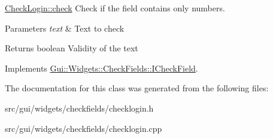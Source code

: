 \hyperlink{classGui_1_1Widgets_1_1CheckFields_1_1CheckLogin_a66e6d426253b5219a55b7ccada37d9b9}{Check\+Login\+::check} Check if the field contains only numbers. 


\begin{DoxyParams}{Parameters}
{\em text} & Text to check \\
\hline
\end{DoxyParams}
\begin{DoxyReturn}{Returns}
boolean Validity of the text 
\end{DoxyReturn}


Implements \hyperlink{classGui_1_1Widgets_1_1CheckFields_1_1ICheckField_a818700a4a8c95eacfc39b85c74e71144}{Gui\+::\+Widgets\+::\+Check\+Fields\+::\+I\+Check\+Field}.



The documentation for this class was generated from the following files\+:\begin{DoxyCompactItemize}
\item 
src/gui/widgets/checkfields/checklogin.\+h\item 
src/gui/widgets/checkfields/checklogin.\+cpp\end{DoxyCompactItemize}

